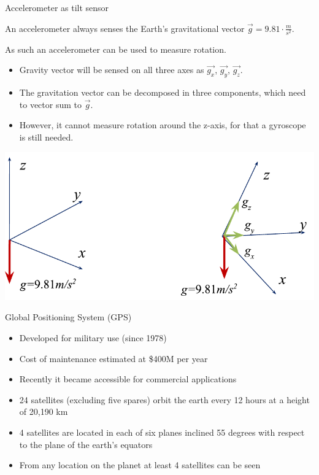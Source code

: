 \documentclass[compress]{beamer}
\begin{document}
\begin{frame}{Accelerometer as tilt sensor}

An accelerometer always senses the Earth's gravitational vector $\vec{g} = 9.81\cdot\frac{m}{s^2}$.

As such an accelerometer can be used to measure rotation.

    \begin{itemize}
        \item Gravity vector will be sensed on all three axes as $\vec{g_x}$, $\vec{g_y}$, $\vec{g_z}$.

        \item The gravitation vector can be decomposed in three components, which
            need to vector sum to $\vec{g}$.

        \item However, it cannot measure rotation around the z-axis, for that a
            gyroscope is still needed.

    \end{itemize}

    \begin{center}
        \includegraphics[width=0.5\linewidth]{accelero_tilt}
    \end{center}

\end{frame}

\begin{frame}{Global Positioning System (GPS)}

\begin{itemize}

\item
  Developed for military use (since 1978)
\item
  Cost of maintenance estimated at \$400M per year
\item
  Recently it became accessible for commercial applications
\item
  24 satellites (excluding five spares) orbit the earth every 12 hours
  at a height of 20,190 km
\item
  4 satellites are located in each of six planes inclined 55 degrees
  with respect to the plane of the earth's equators
\item
  From any location on the planet at least 4 satellites can be seen
\end{itemize}

\end{frame}
\end{document}
